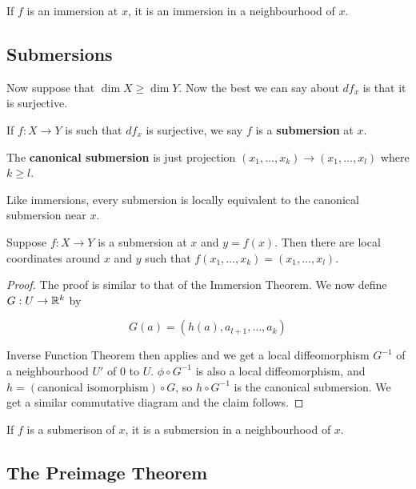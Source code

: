 \begin{corollary}
    If $f$ is an immersion at $x$, it is an immersion in a neighbourhood of $x$. 
\end{corollary}

\subsection{Submersions}

Now suppose that $\dim X \geq \dim Y$. Now the best we can say about $df_x$ is that it is surjective. 

\begin{definition}
    If $f: X \to Y$ is such that $df_x$ is surjective, we say $f$ is a \textbf{submersion} at $x$. 

    The \textbf{canonical submersion} is just projection $(x_1, \ldots, x_k) \to (x_1, \ldots, x_l)$ where $k \geq l$. 
\end{definition}

Like immersions, every submersion is locally equivalent to the canonical submersion near $x$. 

\begin{theorem}
    Suppose $f: X \to Y$ is a submersion at $x$ and $y = f(x)$. Then there are local coordinates around $x$ and $y$ such that $f(x_1,\ldots, x_k) = (x_1,\ldots,x_l)$. 
\end{theorem}

\begin{proof}
    The proof is similar to that of the Immersion Theorem. We now define $G: U \to \mathbb{R}^k$ by 

    \[G(a) = (h(a), a_{l+1}, \ldots, a_k)\]

    Inverse Function Theorem then applies and we get a local diffeomorphism $G^{-1}$ of a neighbourhood $U'$ of 0 to $U$. $\phi \circ G^{-1}$ is also a local diffeomorphism, and $h = (\text{canonical isomorphism}) \circ G$, so $h \circ G^{-1}$ is the canonical submersion. We get a similar commutative diagram and the claim follows. 
\end{proof}

\begin{corollary}
    If $f$ is a submerison of $x$, it is a submersion in a neighbourhood of $x$. 
\end{corollary}

\subsection{The Preimage Theorem}

